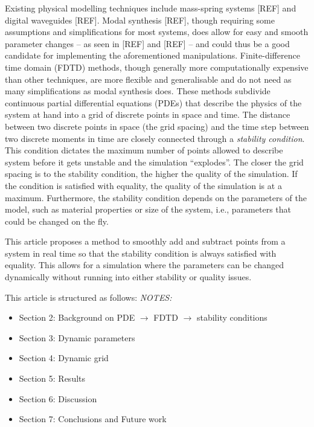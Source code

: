 \documentclass[dvipsnames, preprint]{JASA}
\begin{document}
Existing physical modelling techniques include mass-spring systems [REF] and digital waveguides [REF]. Modal synthesis [REF], though requiring some assumptions and simplifications for most systems, does allow for easy and smooth parameter changes -- as seen in [REF] and [REF] -- and could thus be a good candidate for implementing the aforementioned manipulations. Finite-difference time domain (FDTD) methods, though generally more computationally expensive than other techniques, are more flexible and generalisable and do not need as many simplifications as modal synthesis does. These methods subdivide continuous partial differential equations (PDEs) that describe the physics of the system at hand into a grid of discrete points in space and time. 
%
%
The distance between two discrete points in space (the grid spacing) and the time step between two discrete moments in time are closely connected through a \textit{stability condition}. This condition dictates the maximum number of points allowed to describe system before it gets unstable and the simulation ``explodes''. The closer the grid spacing is to the stability condition, the higher the quality of the simulation. If the condition is satisfied with equality, the quality of the simulation is at a maximum. 
Furthermore, the stability condition depends on the parameters of the model, such as material properties or size of the system, i.e., parameters that could be changed on the fly.

This article proposes a method to smoothly add and subtract points from a system in real time so that the stability condition is always satisfied with equality. This allows for a simulation where the parameters can be changed dynamically without running into either stability or quality issues. 

This article is structured as follows: 
\textit{NOTES:}
\begin{itemize}
\item Section 2: Background on PDE $\rightarrow$ FDTD $\rightarrow$ stability conditions 
\item Section 3: Dynamic parameters
\item Section 4: Dynamic grid
\item Section 5: Results
\item Section 6: Discussion
\item Section 7: Conclusions and Future work
\end{itemize}
\end{document}
